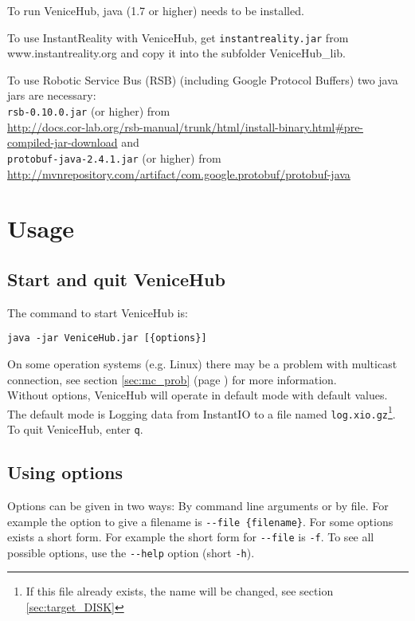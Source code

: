 \documentclass[german,a4paper]{article}
\begin{document}
To run VeniceHub, java (1.7 or higher) needs to be installed.

To use InstantReality with VeniceHub, get \texttt{instantreality.jar} from www.instantreality.org and copy it into the subfolder VeniceHub\_lib.

To use Robotic Service Bus (RSB) (including Google Protocol Buffers) two java jars are necessary:\\
\texttt{rsb-0.10.0.jar} (or higher) from\\
\url{http://docs.cor-lab.org/rsb-manual/trunk/html/install-binary.html\#pre-compiled-jar-download}
and\\
\texttt{protobuf-java-2.4.1.jar} (or higher) from\\
\url{http://mvnrepository.com/artifact/com.google.protobuf/protobuf-java}


\section{Usage}

\subsection{Start and quit VeniceHub}
The command to start VeniceHub is:
\begin{lstlisting}
java -jar VeniceHub.jar [{options}]
\end{lstlisting}
On some operation systems (e.g. Linux) there may be a problem with multicast connection, see section \ref{sec:mc_prob} (page \pageref{sec:mc_prob}) for more information.\\
Without options, VeniceHub will operate in default mode with default values. The default mode is Logging data from InstantIO to a file named \texttt{log.xio.gz}\footnote{If this file already exists, the name will be changed, see section \ref{sec:target_DISK}}.\\
To quit VeniceHub, enter \texttt{q}.

\subsection{Using options}
Options can be given in two ways: By command line arguments or by file. For example the option to give a filename is \texttt{-\--file \{filename\}}. For some options exists a short form. For example the short form for \texttt{-\--file} is \texttt{-f}. To see all possible options, use the \texttt{-\--help} option (short \texttt{-h}).\\
\end{document}
